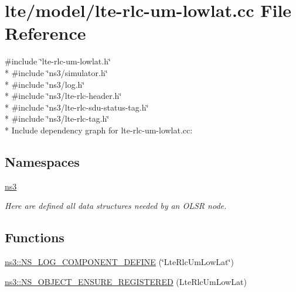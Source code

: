 \hypertarget{lte-rlc-um-lowlat_8cc}{}\section{lte/model/lte-\/rlc-\/um-\/lowlat.cc File Reference}
\label{lte-rlc-um-lowlat_8cc}
{\ttfamily \#include \char`\"{}lte-\/rlc-\/um-\/lowlat.\+h\char`\"{}}\\*
{\ttfamily \#include \char`\"{}ns3/simulator.\+h\char`\"{}}\\*
{\ttfamily \#include \char`\"{}ns3/log.\+h\char`\"{}}\\*
{\ttfamily \#include \char`\"{}ns3/lte-\/rlc-\/header.\+h\char`\"{}}\\*
{\ttfamily \#include \char`\"{}ns3/lte-\/rlc-\/sdu-\/status-\/tag.\+h\char`\"{}}\\*
{\ttfamily \#include \char`\"{}ns3/lte-\/rlc-\/tag.\+h\char`\"{}}\\*
Include dependency graph for lte-\/rlc-\/um-\/lowlat.cc\+:
\subsection*{Namespaces}
\begin{DoxyCompactItemize}
\item 
 \hyperlink{namespacens3}{ns3}
\begin{DoxyCompactList}\small\item\em Here are defined all data structures needed by an O\+L\+SR node. \end{DoxyCompactList}\end{DoxyCompactItemize}
\subsection*{Functions}
\begin{DoxyCompactItemize}
\item 
\hyperlink{namespacens3_a451819272833da771fc76fbde6ccfbc9}{ns3\+::\+N\+S\+\_\+\+L\+O\+G\+\_\+\+C\+O\+M\+P\+O\+N\+E\+N\+T\+\_\+\+D\+E\+F\+I\+NE} (\char`\"{}Lte\+Rlc\+Um\+Low\+Lat\char`\"{})
\item 
\hyperlink{namespacens3_ad9c3bea514d655582e9a013122ebbb17}{ns3\+::\+N\+S\+\_\+\+O\+B\+J\+E\+C\+T\+\_\+\+E\+N\+S\+U\+R\+E\+\_\+\+R\+E\+G\+I\+S\+T\+E\+R\+ED} (Lte\+Rlc\+Um\+Low\+Lat)
\end{DoxyCompactItemize}
